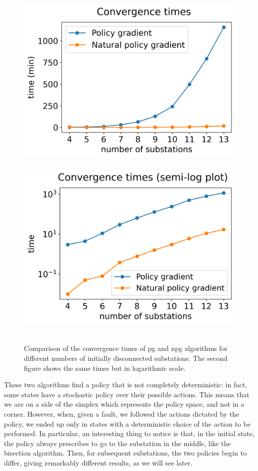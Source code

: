 \begin{figure}[t]
    \centering
    \mbox{
        \hspace*{-15pt}\includegraphics[scale=0.52]{chapters/figures/times_graph.png}
        \hspace*{-5pt}\includegraphics[scale=0.52]{chapters/figures/times_graph_log.png}
    }
    \caption{Comparison of the convergence times of \acrshort{pg} and \acrshort{npg} algorithms for different numbers of initially disconnected substations. The second figure shows the same times but in logarithmic scale.}
    \label{fig:times}
\end{figure}

These two algorithms find a policy that is not completely deterministic: in fact, some states have a stochastic policy over their possible actions. This means that we are on a side of the simplex which represents the policy space, and not in a corner. However, when, given a fault, we followed the actions dictated by the policy, we ended up only in states with a deterministic choice of the action to be performed. In particular, an interesting thing to notice is that, in the initial state, the policy always prescribes to go to the substation in the middle, like the bisection algorithm. Then, for subsequent substations, the two policies begin to differ, giving remarkably different results, as we will see later.

